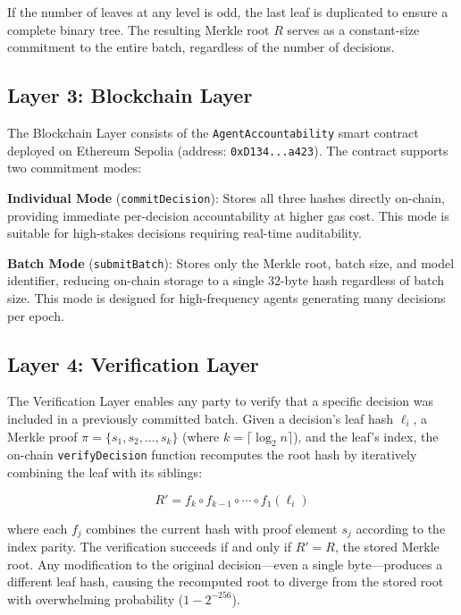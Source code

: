 \documentclass[manuscript,nonacm]{acmart}
\begin{document}
If the number of leaves at any level is odd, the last leaf is duplicated to ensure a complete binary tree. The resulting Merkle root $R$ serves as a constant-size commitment to the entire batch, regardless of the number of decisions.

\subsection{Layer 3: Blockchain Layer}

The Blockchain Layer consists of the \texttt{AgentAccountability} smart contract deployed on Ethereum Sepolia (address: \texttt{0xD134...a423}). The contract supports two commitment modes:

\textbf{Individual Mode} (\texttt{commitDecision}): Stores all three hashes directly on-chain, providing immediate per-decision accountability at higher gas cost. This mode is suitable for high-stakes decisions requiring real-time auditability.

\textbf{Batch Mode} (\texttt{submitBatch}): Stores only the Merkle root, batch size, and model identifier, reducing on-chain storage to a single 32-byte hash regardless of batch size. This mode is designed for high-frequency agents generating many decisions per epoch.

\subsection{Layer 4: Verification Layer}

The Verification Layer enables any party to verify that a specific decision was included in a previously committed batch. Given a decision's leaf hash $\ell_i$, a Merkle proof $\pi = \{s_1, s_2, \ldots, s_k\}$ (where $k = \lceil \log_2 n \rceil$), and the leaf's index, the on-chain \texttt{verifyDecision} function recomputes the root hash by iteratively combining the leaf with its siblings:

\begin{equation}
R' = f_k \circ f_{k-1} \circ \cdots \circ f_1(\ell_i)
\end{equation}

where each $f_j$ combines the current hash with proof element $s_j$ according to the index parity. The verification succeeds if and only if $R' = R$, the stored Merkle root. Any modification to the original decision---even a single byte---produces a different leaf hash, causing the recomputed root to diverge from the stored root with overwhelming probability ($1 - 2^{-256}$).
\end{document}
